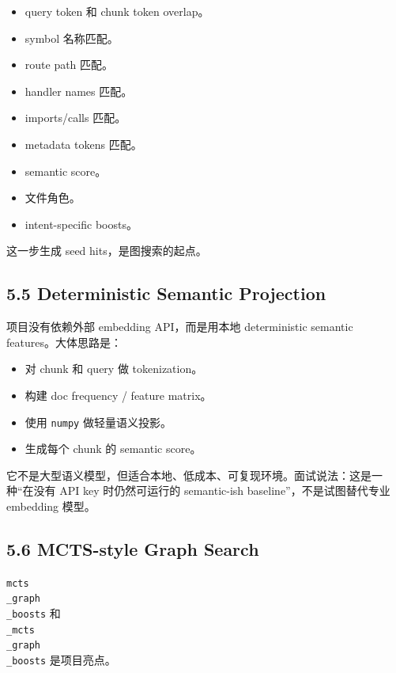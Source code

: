 \documentclass[UTF8,12pt,openany]{ctexbook}
\begin{document}
\begin{itemize}
\item query token 和 chunk token overlap。
\item symbol 名称匹配。
\item route path 匹配。
\item handler names 匹配。
\item imports/calls 匹配。
\item metadata tokens 匹配。
\item semantic score。
\item 文件角色。
\item intent-specific boosts。
\end{itemize}

这一步生成 seed hits，是图搜索的起点。\par

\subsection{5.5 Deterministic Semantic Projection}

项目没有依赖外部 embedding API，而是用本地 deterministic semantic features。大体思路是：\par

\begin{itemize}
\item 对 chunk 和 query 做 tokenization。
\item 构建 doc frequency / feature matrix。
\item 使用 \texttt{numpy} 做轻量语义投影。
\item 生成每个 chunk 的 semantic score。
\end{itemize}

它不是大型语义模型，但适合本地、低成本、可复现环境。面试说法：这是一种“在没有 API key 时仍然可运行的 semantic-ish baseline”，不是试图替代专业 embedding 模型。\par

\subsection{5.6 MCTS-style Graph Search}

\texttt{mcts\\_graph\\_boosts} 和 \texttt{\\_mcts\\_graph\\_boosts} 是项目亮点。\par
\end{document}
